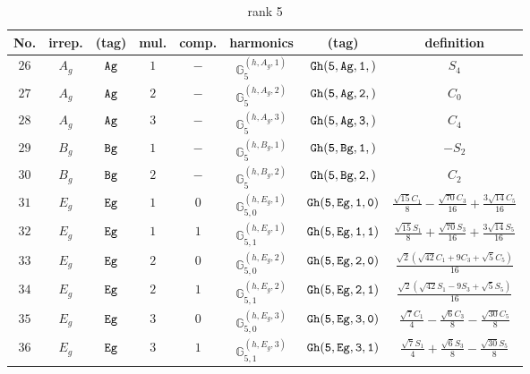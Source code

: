 \documentclass[fleqn,8pt]{jsarticle}
\begin{document}
\begin{table}[ht!]
\begin{center}
\caption{rank 5}
\renewcommand{\arraystretch}{1.3}
\begin{tabular}{cccccccc} \hline \hline
No. & irrep. & (tag) & mul. & comp. & harmonics & (tag) & definition \\ \hline
$ 26 $ & $ A_{g} $ & $ {\tt Ag} $ & $ 1 $ & $ - $ & $ \mathbb{G}_{5}^{(h,A_{g},1)} $ & $ {\tt Gh(5,Ag,1,)} $ & $ S_{4} $ \\
$ 27 $ & $ A_{g} $ & $ {\tt Ag} $ & $ 2 $ & $ - $ & $ \mathbb{G}_{5}^{(h,A_{g},2)} $ & $ {\tt Gh(5,Ag,2,)} $ & $ C_{0} $ \\
$ 28 $ & $ A_{g} $ & $ {\tt Ag} $ & $ 3 $ & $ - $ & $ \mathbb{G}_{5}^{(h,A_{g},3)} $ & $ {\tt Gh(5,Ag,3,)} $ & $ C_{4} $ \\
$ 29 $ & $ B_{g} $ & $ {\tt Bg} $ & $ 1 $ & $ - $ & $ \mathbb{G}_{5}^{(h,B_{g},1)} $ & $ {\tt Gh(5,Bg,1,)} $ & $ - S_{2} $ \\
$ 30 $ & $ B_{g} $ & $ {\tt Bg} $ & $ 2 $ & $ - $ & $ \mathbb{G}_{5}^{(h,B_{g},2)} $ & $ {\tt Gh(5,Bg,2,)} $ & $ C_{2} $ \\
$ 31 $ & $ E_{g} $ & $ {\tt Eg} $ & $ 1 $ & $ 0 $ & $ \mathbb{G}_{5,0}^{(h,E_{g},1)} $ & $ {\tt Gh(5,Eg,1,0)} $ & $ \frac{\sqrt{15} C_{1}}{8} - \frac{\sqrt{70} C_{3}}{16} + \frac{3 \sqrt{14} C_{5}}{16} $ \\
$ 32 $ & $ E_{g} $ & $ {\tt Eg} $ & $ 1 $ & $ 1 $ & $ \mathbb{G}_{5,1}^{(h,E_{g},1)} $ & $ {\tt Gh(5,Eg,1,1)} $ & $ \frac{\sqrt{15} S_{1}}{8} + \frac{\sqrt{70} S_{3}}{16} + \frac{3 \sqrt{14} S_{5}}{16} $ \\
$ 33 $ & $ E_{g} $ & $ {\tt Eg} $ & $ 2 $ & $ 0 $ & $ \mathbb{G}_{5,0}^{(h,E_{g},2)} $ & $ {\tt Gh(5,Eg,2,0)} $ & $ \frac{\sqrt{2} \left(\sqrt{42} C_{1} + 9 C_{3} + \sqrt{5} C_{5}\right)}{16} $ \\
$ 34 $ & $ E_{g} $ & $ {\tt Eg} $ & $ 2 $ & $ 1 $ & $ \mathbb{G}_{5,1}^{(h,E_{g},2)} $ & $ {\tt Gh(5,Eg,2,1)} $ & $ \frac{\sqrt{2} \left(\sqrt{42} S_{1} - 9 S_{3} + \sqrt{5} S_{5}\right)}{16} $ \\
$ 35 $ & $ E_{g} $ & $ {\tt Eg} $ & $ 3 $ & $ 0 $ & $ \mathbb{G}_{5,0}^{(h,E_{g},3)} $ & $ {\tt Gh(5,Eg,3,0)} $ & $ \frac{\sqrt{7} C_{1}}{4} - \frac{\sqrt{6} C_{3}}{8} - \frac{\sqrt{30} C_{5}}{8} $ \\
$ 36 $ & $ E_{g} $ & $ {\tt Eg} $ & $ 3 $ & $ 1 $ & $ \mathbb{G}_{5,1}^{(h,E_{g},3)} $ & $ {\tt Gh(5,Eg,3,1)} $ & $ \frac{\sqrt{7} S_{1}}{4} + \frac{\sqrt{6} S_{3}}{8} - \frac{\sqrt{30} S_{5}}{8} $ \\
 \hline \hline
\end{tabular}
\end{center}
\end{table}
\end{document}
